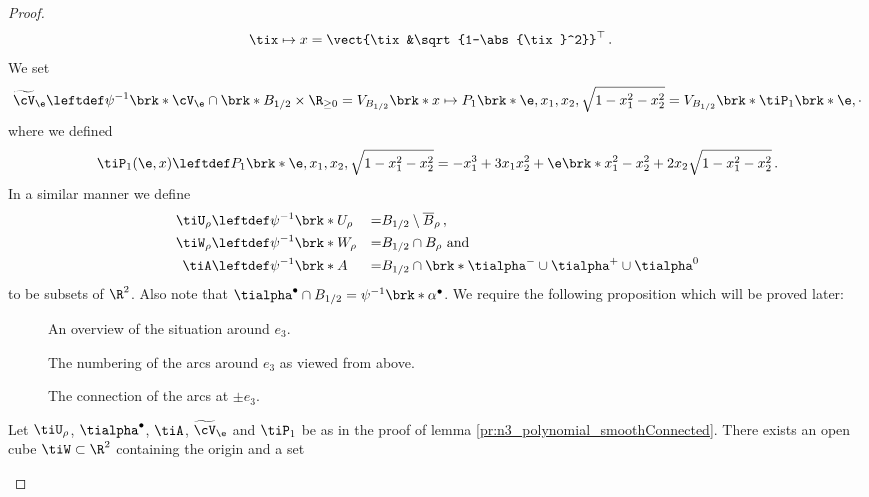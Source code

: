 \begin{proof}
\begin{align*}
    \tix&\mapsto x=\vect{\tix&\sqrt{1-\abs{\tix}^2}}^\top\,.
  \end{align*}
  We set
  \begin{align*}
    \widetilde{\cV}_\e\leftdef\psi^{-1}\brk*{\cV_\e\cap \brk*{B_{1/2}\times\R_{\geq0}}}
    =V_{B_{1/2}}\brk*{x\mapsto P_1\brk*{\e,x_1,x_2,\sqrt{1-x_1^2-x_2^2}}}
    =V_{B_{1/2}}\brk*{\tiP_1\brk*{\e,\cdot}}
  \end{align*}
  where we defined
  \begin{align*}
    \tiP_1(\e,x)\leftdef P_1\brk*{\e,x_1,x_2,\sqrt{1-x_1^2-x_2^2}}
    =-x_1^3+3x_1x_2^2+\e\brk*{x_1^2-x_2^2+2x_2\sqrt{1-x_1^2-x_2^2}}\,.
  \end{align*}
  In a similar manner we define 
  \begin{alignat*}{3}
    \tiU_\rho&\leftdef\psi^{-1}\brk*{U_\rho}&=& B_{1/2}\setminus \overline{B}_\rho\,, \\
    \tiW_\rho&\leftdef\psi^{-1}\brk*{W_\rho}&=& B_{1/2}\cap B_{\rho}\text{ and} \\
    \tiA&\leftdef\psi^{-1}\brk*{A}&=&B_{1/2}\cap\brk*{\tialpha^-\cup\tialpha^+\cup\tialpha^0}
  \end{alignat*}
  to be subsets of $\R^2$. Also note that $\tialpha^\bullet\cap B_{1/2}=\psi^{-1}\brk*{\alpha^\bullet}$.
  We require the following proposition which will be proved later:
  \begin{figure}[h]
    \centering
    \def\svgwidth{0.8\textwidth}
    
    \caption{An overview of the situation around $e_3$.}
    \label{fi:n3_polynomial_arcOverview}
  \end{figure}
  \begin{figure}[h]
    \centering
    
    \caption{The numbering of the arcs around $e_3$ as viewed from above.}
    \label{fi:n3_polynomial_arcNumbering}
  \end{figure}
  \begin{figure}[h]
    \centering
    
    \caption{The connection of the arcs at $\pm e_3$.}
    \label{fi:n3_polynomial_arcConnections}
  \end{figure}
  \begin{proposition}\label{pr:n3_polynomial_regularH}
    Let $\tiU_\rho$, $\tialpha^\bullet$, $\tiA$, $\widetilde{\cV}_\e$ and $\tiP_1$ be as in the proof of lemma \ref{pr:n3_polynomial_smoothConnected}.
    There exists an open cube $\tiW\subset\R^2$ containing the origin and a set 

\end{proposition}
\end{proof}
